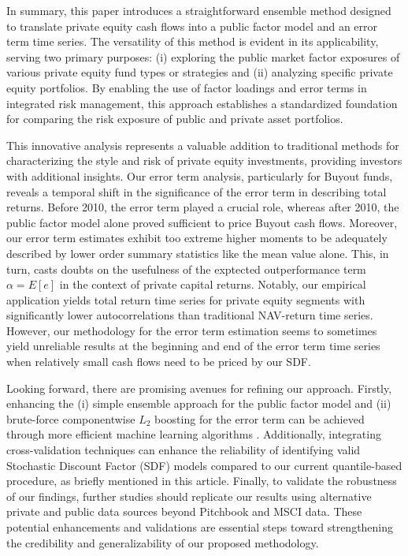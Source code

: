 \documentclass[12pt]{article}
\begin{document}
In summary, this paper introduces a straightforward ensemble method designed to translate private equity cash flows into a public factor model and an error term time series. 
The versatility of this method is evident in its applicability, serving two primary purposes: 
(i) exploring the public market factor exposures of various private equity fund types or strategies and (ii) analyzing specific private equity portfolios. 
By enabling the use of factor loadings and error terms in integrated risk management, this approach establishes a standardized foundation for comparing the risk exposure of public and private asset portfolios.

This innovative analysis represents a valuable addition to traditional methods for characterizing the style and risk of private equity investments, providing investors with additional insights. 
Our error term analysis, particularly for Buyout funds, reveals a temporal shift in the significance of the error term in describing total returns. 
Before 2010, the error term played a crucial role, whereas after 2010, the public factor model alone proved sufficient to price Buyout cash flows. 
Moreover, our error term estimates exhibit too extreme higher moments to be adequately  described by lower order summary statistics like the mean value alone.
This, in turn, casts doubts on the usefulness of the exptected outperformance term $\alpha = E [ e ]$ in the context of private capital returns.
Notably, our empirical application yields total return time series for private equity segments with significantly lower autocorrelations than traditional NAV-return time series.
However, our methodology for the error term estimation seems to sometimes yield unreliable results at the beginning and end of the error term time series when relatively small cash flows need to be priced by our SDF.

Looking forward, there are promising avenues for refining our approach. 
Firstly, enhancing the (i) simple ensemble approach for the public factor model and (ii) brute-force componentwise $L_2$ boosting for the error term can be achieved through more efficient machine learning algorithms \citep{B12}.
Additionally, integrating cross-validation techniques can enhance the reliability of identifying valid Stochastic Discount Factor (SDF) models compared to our current quantile-based procedure, as briefly mentioned in this article.
Finally, to validate the robustness of our findings, further studies should replicate our results using alternative private and public data sources beyond Pitchbook and MSCI data. 
These potential enhancements and validations are essential steps toward strengthening the credibility and generalizability of our proposed methodology.




\appendix

% 
% 
% 
\end{document}
